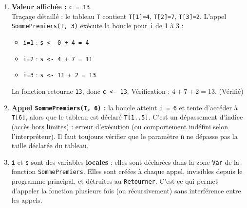 \documentclass[11pt]{article}
\newcommand{\cle}[1]{{\popxbold\color{popdark}#1}}
\begin{document}
\begin{corrige}
\begin{enumerate}
    \item \textbf{Valeur affichée :} \texttt{c = 13}.\\
    Traçage détaillé : le tableau \texttt{T} contient \texttt{T[1]=4}, \texttt{T[2]=7}, \texttt{T[3]=2}. L'appel \texttt{SommePremiers(T, 3)} exécute la boucle pour \texttt{i} de 1 à 3 :
    \begin{itemize}
        \item \texttt{i=1} : \texttt{s <- 0 + 4 = 4}
        \item \texttt{i=2} : \texttt{s <- 4 + 7 = 11}
        \item \texttt{i=3} : \texttt{s <- 11 + 2 = 13}
    \end{itemize}
    La fonction retourne \texttt{13}, donc \texttt{c <- 13}. Vérification : $4+7+2 = 13$. (Vérifié)
    \item \textbf{Appel \texttt{SommePremiers(T, 6)} :} la boucle atteint \texttt{i = 6} et tente d'accéder à \texttt{T[6]}, alors que le tableau est déclaré \texttt{T[1..5]}. C'est un \cle{dépassement d'indice} (accès hors limites) : erreur d'exécution (ou comportement indéfini selon l'interpréteur). Il faut toujours vérifier que le paramètre \texttt{n} ne dépasse pas la taille déclarée du tableau.
    \item \texttt{i} et \texttt{s} sont des variables \textbf{locales} : elles sont déclarées dans la zone \texttt{Var} de la fonction \texttt{SommePremiers}. Elles sont créées à chaque appel, invisibles depuis le programme principal, et détruites au \texttt{Retourner}. C'est ce qui permet d'appeler la fonction plusieurs fois (ou récursivement) sans interférence entre les appels.
\end{enumerate}
\end{corrige}
\end{document}
